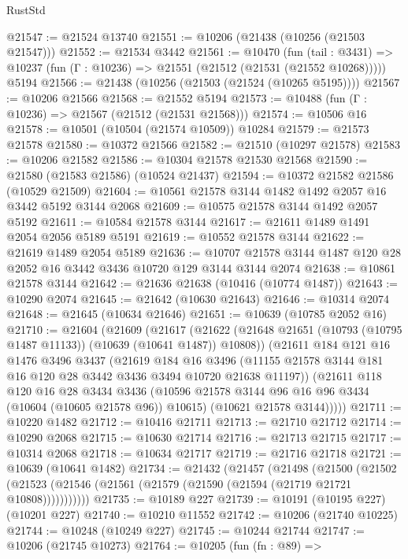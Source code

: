 \begin{lexlean}{RustStd}
\begin{coremodule}
@21547 := @21524 @13740
@21551 := @10206 (@21438 (@10256 (@21503 @21547)))
@21552 := @21534 @3442
@21561 := @10470
    (fun (tail : @3431) => @10237 (fun (Γ : @10236) => @21551 (@21512 (@21531 (@21552 @10268)))))
    @5194
@21566 := @21438 (@10256 (@21503 (@21524 (@10265 @5195))))
@21567 := @10206 @21566
@21568 := @21552 @5194
@21573 := @10488 (fun (Γ : @10236) => @21567 (@21512 (@21531 @21568)))
@21574 := @10506 @16
@21578 := @10501 (@10504 (@21574 @10509)) @10284
@21579 := @21573 @21578
@21580 := @10372 @21566
@21582 := @21510 (@10297 @21578)
@21583 := @10206 @21582
@21586 := @10304 @21578 @21530 @21568
@21590 := @21580 (@21583 @21586) (@10524 @21437)
@21594 := @10372 @21582 @21586 (@10529 @21509)
@21604 := @10561 @21578 @3144 @1482 @1492 @2057 @16 @3442 @5192 @3144 @2068
@21609 := @10575 @21578 @3144 @1492 @2057 @5192
@21611 := @10584 @21578 @3144
@21617 := @21611 @1489 @1491 @2054 @2056 @5189 @5191
@21619 := @10552 @21578 @3144
@21622 := @21619 @1489 @2054 @5189
@21636 := @10707 @21578 @3144 @1487 @120 @28 @2052 @16 @3442 @3436 @10720 @129 @3144 @3144 @2074
@21638 := @10861 @21578 @3144
@21642 := @21636 @21638 (@10416 (@10774 @1487))
@21643 := @10290 @2074
@21645 := @21642 (@10630 @21643)
@21646 := @10314 @2074
@21648 := @21645 (@10634 @21646)
@21651 := @10639 (@10785 @2052 @16)
@21710 := @21604
    (@21609
      (@21617
        (@21622 (@21648 @21651 (@10793 (@10795 @1487 @11133)) (@10639 (@10641 @1487)) @10808))
        (@21611
          @184
          @121
          @16
          @1476
          @3496
          @3437
          (@21619
            @184
            @16
            @3496
            (@11155 @21578 @3144 @181 @16 @120 @28 @3442 @3436 @3494 @10720 @21638 @11197))
          (@21611
            @118
            @120
            @16
            @28
            @3434
            @3436
            (@10596 @21578 @3144 @96 @16 @96 @3434 (@10604 (@10605 @21578 @96)) @10615)
            (@10621 @21578 @3144)))))
@21711 := @10220 @1482
@21712 := @10416 @21711
@21713 := @21710 @21712
@21714 := @10290 @2068
@21715 := @10630 @21714
@21716 := @21713 @21715
@21717 := @10314 @2068
@21718 := @10634 @21717
@21719 := @21716 @21718
@21721 := @10639 (@10641 @1482)
@21734 := @21432
    (@21457
      (@21498
        (@21500
          (@21502 (@21523 (@21546 (@21561 (@21579 (@21590 (@21594 (@21719 @21721 @10808)))))))))))
@21735 := @10189 @227
@21739 := @10191 (@10195 @227) (@10201 @227)
@21740 := @10210 @11552
@21742 := @10206 (@21740 @10225)
@21744 := @10248 (@10249 @227)
@21745 := @10244 @21744
@21747 := @10206 (@21745 @10273)
@21764 := @10205
    (fun (fn : @89) =>

\end{coremodule}
\end{lexlean}
